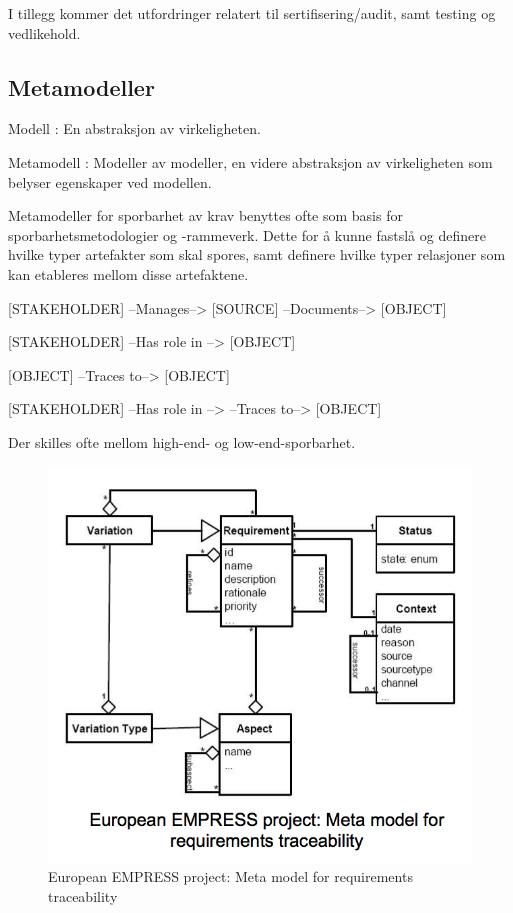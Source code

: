I tillegg kommer det utfordringer relatert til sertifisering/audit, samt
testing og vedlikehold.

\subsection{Metamodeller}

Modell : En abstraksjon av virkeligheten.

Metamodell : Modeller av modeller, en videre abstraksjon av
virkeligheten som belyser egenskaper ved modellen.

Metamodeller for sporbarhet av krav benyttes ofte som basis for
sporbarhetsmetodologier og -rammeverk. Dette for å kunne fastslå og
definere hvilke typer artefakter som skal spores, samt definere hvilke
typer relasjoner som kan etableres mellom disse artefaktene.

{[}STAKEHOLDER{]} --Manages--\textgreater{} {[}SOURCE{]}
--Documents--\textgreater{} {[}OBJECT{]}

{[}STAKEHOLDER{]} --Has role in --\textgreater{} {[}OBJECT{]}

{[}OBJECT{]} --Traces to--\textgreater{} {[}OBJECT{]}

{[}STAKEHOLDER{]} --Has role in --\textgreater{} --Traces
to--\textgreater{} {[}OBJECT{]}

Der skilles ofte mellom high-end- og low-end-sporbarhet.

\begin{figure}[htbp]
\centering
\includegraphics{Forelesning 03/img/3.png}
\caption{European EMPRESS project: Meta model for requirements
traceability}
\end{figure}

